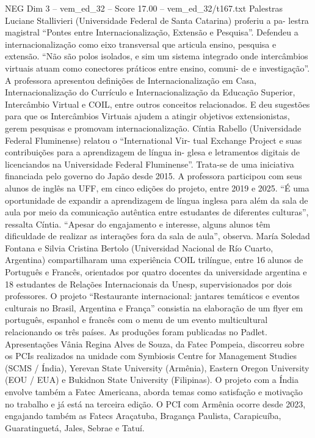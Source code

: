 \begin{textsample}{NEG Dim 3 – vem\_ed\_32 – Score 17.00 – vem\_ed\_32/t167.txt}
Palestras Luciane Stallivieri (Universidade Federal de Santa Catarina) proferiu a pa- lestra magistral “Pontes entre Internacionalização, Extensão e Pesquisa”.
Defendeu a internacionalização como eixo transversal que articula ensino, pesquisa e extensão. “Não são polos isolados, e sim um sistema integrado onde intercâmbios virtuais atuam como conectores práticos entre ensino, comuni- de e investigação”.
A professora apresentou definições de Internacionalização em Casa, Internacionalização do Currículo e Internacionalização da Educação Superior, Intercâmbio Virtual e COIL, entre outros conceitos relacionados.
E deu sugestões para que os Intercâmbios Virtuais ajudem a atingir objetivos extensionistas, gerem pesquisas e promovam internacionalização.
Cíntia Rabello (Universidade Federal Fluminense) relatou o “International Vir- tual Exchange Project e suas contribuições para a aprendizagem de língua in- glesa e letramentos digitais de licenciandos na Universidade Federal Fluminense”.
Trata-se de uma iniciativa financiada pelo governo do Japão desde 2015.
A professora participou com seus alunos de inglês na UFF, em cinco edições do projeto, entre 2019 e 2025. “É uma oportunidade de expandir a aprendizagem de língua inglesa para além da sala de aula por meio da comunicação autêntica entre estudantes de diferentes culturas”, ressalta Cíntia. “Apesar do engajamento e interesse, alguns alunos têm dificuldade de realizar as interações fora da sala de aula”, observa.
María Soledad Fontana e Silvia Cristina Bertolo (Universidad Nacional de Río Cuarto, Argentina) compartilharam uma experiência COIL trilíngue, entre 16 alunos de Português e Francês, orientados por quatro docentes da universidade argentina e 18 estudantes de Relações Internacionais da Unesp, supervisionados por dois professores.
O projeto “Restaurante internacional: jantares temáticos e eventos culturais no Brasil, Argentina e França” consistia na elaboração de um flyer em português, espanhol e francês com o menu de um evento multicultural relacionando os três países.
As produções foram publicadas no Padlet.
Apresentações Vânia Regina Alves de Souza, da Fatec Pompeia, discorreu sobre os PCIs realizados na unidade com Symbiosis Centre for Management Studies (SCMS / Índia), Yerevan State University (Armênia), Eastern Oregon University (EOU / EUA) e Bukidnon State University (Filipinas).
O projeto com a Índia envolve também a Fatec Americana, aborda temas como satisfação e motivação no trabalho e já está na terceira edição.
O PCI com Armênia ocorre desde 2023, engajando também as Fatecs Araçatuba, Bragança Paulista, Carapicuíba, Guaratinguetá, Jales, Sebrae e Tatuí.

\end{textsample}
